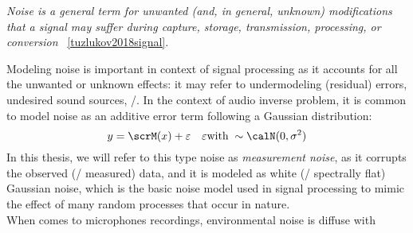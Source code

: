 \begin{center}
    \textit{\emph{Noise} is a general term for unwanted (and, in general, unknown) modifications that a signal may suffer during capture, storage, transmission, processing, or conversion}
    ~\cref{tuzlukov2018signal}.
\end{center}
Modeling noise is important in context of signal processing as it accounts for all the unwanted or unknown effects:
it may refer to undermodeling (residual) errors, undesired sound sources, \etc/.
In the context of audio inverse problem, it is common to model noise as an additive error term following a Gaussian distribution:
\begin{equation}\label{eq:processing:model}
    y = \scrM(x) + \error \mathspace \error \text{with} \; \sim \calN(0, \sigma^2)
\end{equation}
In this thesis, we will refer to this type noise as \textit{measurement noise}, as it corrupts the observed (\ie/ measured) data,
and it is modeled as white (\ie/ spectrally flat) Gaussian noise, which is the basic noise model used in signal processing to mimic the effect of many random processes that occur in nature.
\\When comes to microphones recordings, environmental noise is diffuse with